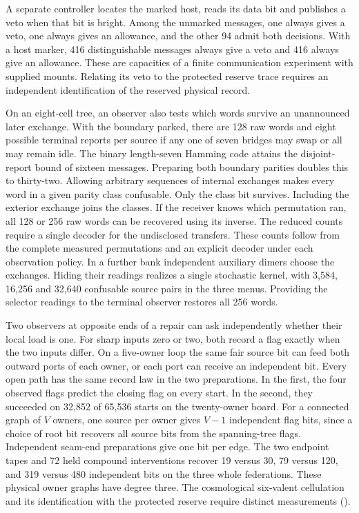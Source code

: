 \documentclass[11pt]{article}
\theoremstyle{remark}
\theoremstyle{plain}
\begin{document}
A separate controller locates the marked host, reads its data bit and
publishes a veto when that bit is bright. Among the unmarked messages,
one always gives a veto, one always gives an allowance, and the other
94 admit both decisions. With a host marker, 416 distinguishable messages always give a veto
and 416 always give an allowance. These are capacities of a finite
communication experiment with supplied mounts. Relating its veto to the
protected reserve trace requires an independent identification of the
reserved physical record.

On an eight-cell tree, an observer also tests which words survive an
unannounced later exchange. With the boundary parked, there are 128 raw
words and eight possible terminal reports per source if any one of seven
bridges may swap or all may remain idle. The binary length-seven Hamming
code attains the disjoint-report bound of sixteen messages. Preparing both
boundary parities doubles this to thirty-two. Allowing arbitrary sequences
of internal exchanges makes every word in a given parity class confusable.
Only the class bit survives. Including the exterior exchange joins the
classes. If the receiver knows which permutation ran, all 128 or 256 raw
words can be recovered using its inverse. The reduced counts require a
single decoder for the undisclosed transfers. These counts follow from the
complete measured permutations and an explicit decoder under each observation
policy. In a further bank independent auxiliary dimers choose the exchanges.
Hiding their readings realizes a single stochastic kernel, with 3,584,
16,256 and 32,640 confusable source pairs in the three menus. Providing the
selector readings to the terminal observer restores all 256 words.

Two observers at opposite ends of a repair can ask independently whether
their local load is one. For sharp inputs zero or two, both record a flag
exactly when the two inputs differ. On a five-owner loop the same fair
source bit can feed both outward ports of each owner, or each port
can receive an independent bit. Every open path has the same record
law in the two preparations. In the first, the four observed flags
predict the closing flag on every start. In the second, they succeeded
on 32,852 of 65,536 starts on the twenty-owner board. For a connected
graph of $V$ owners, one source per owner gives $V-1$ independent flag
bits, since a choice of root bit recovers all source bits from the
spanning-tree flags. Independent seam-end preparations give one bit per
edge. The two endpoint tapes and 72 held compound interventions recover
19 versus 30, 79 versus 120, and 319 versus 480 independent bits on the
three whole federations. These physical owner graphs have degree three.
The cosmological six-valent cellulation and its identification with the
protected reserve require distinct measurements
().
\end{document}
